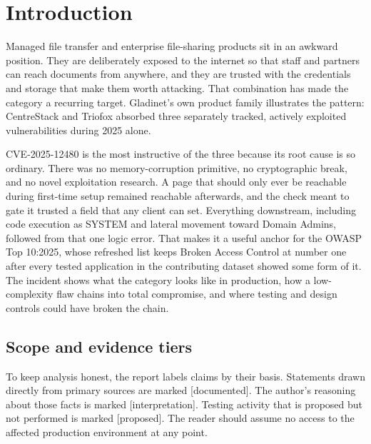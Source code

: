 \documentclass[11pt,a4paper]{article}
\newcommand{\code}[1]{{\small\ttfamily #1}}
\newcommand{\tier}[1]{{\small\color{meta}\textsf{[#1]}}}
\begin{document}
\section{Introduction}

Managed file transfer and enterprise file-sharing products sit in an awkward position. They are deliberately exposed to the internet so that staff and partners can reach documents from anywhere, and they are trusted with the credentials and storage that make them worth attacking. That combination has made the category a recurring target. Gladinet's own product family illustrates the pattern: CentreStack and Triofox absorbed three separately tracked, actively exploited vulnerabilities during 2025 alone.

CVE-2025-12480 is the most instructive of the three because its root cause is so ordinary. There was no memory-corruption primitive, no cryptographic break, and no novel exploitation research. A page that should only ever be reachable during first-time setup remained reachable afterwards, and the check meant to gate it trusted a field that any client can set. Everything downstream, including code execution as \code{SYSTEM} and lateral movement toward Domain Admins, followed from that one logic error. That makes it a useful anchor for the OWASP Top 10:2025, whose refreshed list keeps Broken Access Control at number one after every tested application in the contributing dataset showed some form of it. The incident shows what the category looks like in production, how a low-complexity flaw chains into total compromise, and where testing and design controls could have broken the chain.

\subsection{Scope and evidence tiers}

To keep analysis honest, the report labels claims by their basis. Statements drawn directly from primary sources are marked \tier{documented}. The author's reasoning about those facts is marked \tier{interpretation}. Testing activity that is proposed but not performed is marked \tier{proposed}. The reader should assume no access to the affected production environment at any point.

\end{document}

